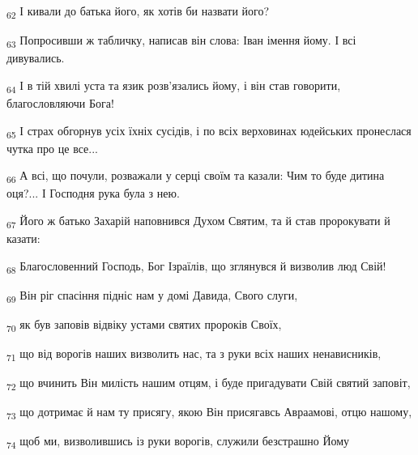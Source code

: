 \begin{tcolorbox}
\textsubscript{62} І кивали до батька його, як хотів би назвати його?
\end{tcolorbox}
\begin{tcolorbox}
\textsubscript{63} Попросивши ж табличку, написав він слова: Іван імення йому. І всі дивувались.
\end{tcolorbox}
\begin{tcolorbox}
\textsubscript{64} І в тій хвилі уста та язик розв'язались йому, і він став говорити, благословляючи Бога!
\end{tcolorbox}
\begin{tcolorbox}
\textsubscript{65} І страх обгорнув усіх їхніх сусідів, і по всіх верховинах юдейських пронеслася чутка про це все...
\end{tcolorbox}
\begin{tcolorbox}
\textsubscript{66} А всі, що почули, розважали у серці своїм та казали: Чим то буде дитина оця?... І Господня рука була з нею.
\end{tcolorbox}
\begin{tcolorbox}
\textsubscript{67} Його ж батько Захарій наповнився Духом Святим, та й став пророкувати й казати:
\end{tcolorbox}
\begin{tcolorbox}
\textsubscript{68} Благословенний Господь, Бог Ізраїлів, що зглянувся й визволив люд Свій!
\end{tcolorbox}
\begin{tcolorbox}
\textsubscript{69} Він ріг спасіння підніс нам у домі Давида, Свого слуги,
\end{tcolorbox}
\begin{tcolorbox}
\textsubscript{70} як був заповів відвіку устами святих пророків Своїх,
\end{tcolorbox}
\begin{tcolorbox}
\textsubscript{71} що від ворогів наших визволить нас, та з руки всіх наших ненависників,
\end{tcolorbox}
\begin{tcolorbox}
\textsubscript{72} що вчинить Він милість нашим отцям, і буде пригадувати Свій святий заповіт,
\end{tcolorbox}
\begin{tcolorbox}
\textsubscript{73} що дотримає й нам ту присягу, якою Він присягавсь Авраамові, отцю нашому,
\end{tcolorbox}
\begin{tcolorbox}
\textsubscript{74} щоб ми, визволившись із руки ворогів, служили безстрашно Йому
\end{tcolorbox}
